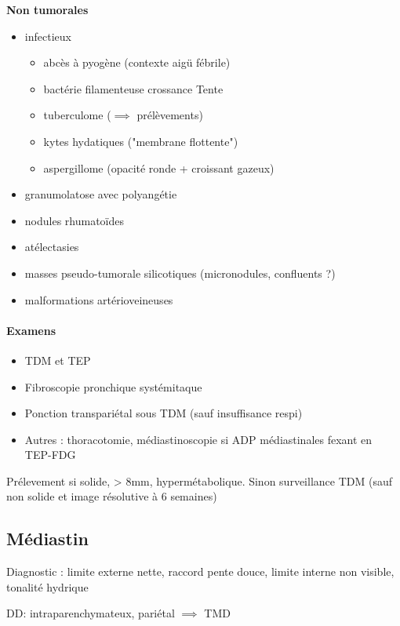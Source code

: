 \textbf{Non tumorales}
\begin{itemize}
  \item infectieux 
    \begin{itemize}
      \item abcès à pyogène (contexte aigü fébrile)
      \item bactérie filamenteuse crossance Tente
      \item tuberculome ($\implies$ prélèvements)
      \item kytes hydatiques ("membrane flottente")
      \item aspergillome (opacité ronde + croissant gazeux)
    \end{itemize}
  \item granumolatose avec polyangétie
  \item nodules rhumatoïdes
  \item atélectasies
  \item masses pseudo-tumorale silicotiques (micronodules, confluents ?)
  \item malformations artérioveineuses
\end{itemize}

\paragraph{Examens}
\begin{itemize}
  \item TDM et TEP
  \item Fibroscopie pronchique systémitaque
  \item Ponction transpariétal sous TDM (sauf insuffisance respi)
  \item Autres : thoracotomie, médiastinoscopie si ADP médiastinales fexant en TEP-FDG
\end{itemize}
Prélevement si solide, > 8mm, hypermétabolique. Sinon surveillance TDM (sauf non solide et image résolutive à 6 semaines)

\subsection{Médiastin}
Diagnostic : limite externe nette, raccord pente douce, limite interne non
visible, tonalité hydrique

DD: intraparenchymateux, pariétal $\implies$ TMD

